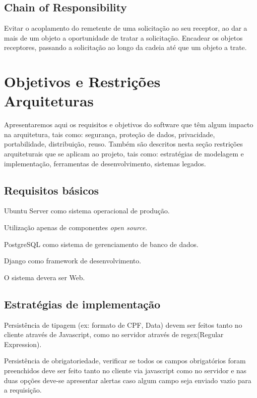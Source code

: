 \subsection{Chain of Responsibility}
Evitar o acoplamento do remetente de uma solicitação ao seu receptor, ao dar a 
mais de um objeto a oportunidade de tratar a solicitação. Encadear os objetos 
receptores, passando a solicitação ao longo da cadeia até que um objeto a trate.

\section{Objetivos e Restrições Arquiteturas}

Apresentaremos aqui os requisitos e objetivos do software que têm algum impacto 
na arquitetura, tais como: segurança, proteção de dados, privacidade, 
portabilidade, distribuição, reuso. Também são descritos nesta seção restrições 
arquiteturais que se aplicam ao projeto, tais  como:  estratégias  de  modelagem e implementação, ferramentas de  desenvolvimento, sistemas legados. 

\subsection{Requisitos básicos}
\begin{alineascomponto}
	\item Ubuntu Server como sistema operacional de produção.
	\item Utilização apenas de componentes \textit{open source}.
	\item PostgreSQL como sistema de gerenciamento de banco de dados.
	\item Django como framework de desenvolvimento.	
	\item O sistema devera ser Web.
\end{alineascomponto}

\subsection{Estratégias de implementação}
\begin{alineascomponto}
	\item Persistência de tipagem (ex: formato de CPF, Data) devem ser feitos 
tanto no cliente através de Javascript, como no servidor através de 
regex(Regular Expression).
	\item Persistência de obrigatoriedade, verificar se todos os campos 
obrigatórios foram  preenchidos deve ser feito tanto no cliente via javascript 
como no servidor e nas duas opções deve-se apresentar alertas caso algum campo 
seja enviado vazio para a requisição.
    
\end{alineascomponto}

